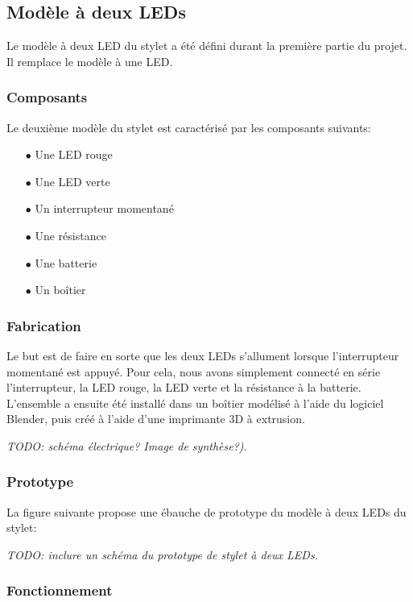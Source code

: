 \documentclass[11pt,a4paper,oldfontcommands]{memoir}
\begin{document}
\newpage

\subsection{Modèle à deux LEDs}

Le modèle à deux LED du stylet a été défini durant la première partie du projet. Il remplace le modèle à une LED.

\subsubsection{Composants}

Le deuxième modèle du stylet est caractérisé par les composants suivants:

\begin{itemize}
\item[$\bullet$] Une LED rouge
\item[$\bullet$] Une LED verte
\item[$\bullet$] Un interrupteur momentané
\item[$\bullet$] Une résistance
\item[$\bullet$] Une batterie
\item[$\bullet$] Un boîtier
\end{itemize}

\subsubsection{Fabrication}

Le but est de faire en sorte que les deux LEDs s'allument lorsque l'interrupteur momentané est appuyé. Pour cela, nous avons simplement connecté en série l'interrupteur, la LED rouge, la LED verte et la résistance à la batterie.
L'ensemble a ensuite été installé dans un boîtier modélisé à l'aide du logiciel Blender, puis créé à l'aide d'une imprimante 3D à extrusion.

\textit{TODO: schéma électrique? Image de synthèse?).}

\subsubsection{Prototype}

La figure suivante propose une ébauche de prototype du modèle à deux LEDs du stylet:

\textit{TODO: inclure un schéma du prototype de stylet à deux LEDs.}

\subsubsection{Fonctionnement}
\end{document}
